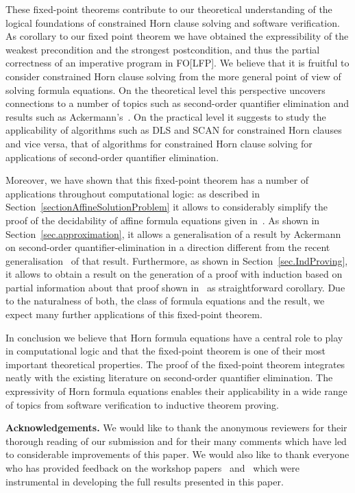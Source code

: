 \documentclass[acmsmall]{acmart}
\theoremstyle{plain}
\theoremstyle{definition}
\begin{document}
These fixed-point theorems contribute to our theoretical understanding of the logical foundations of
 constrained Horn clause solving and software verification.
As corollary to our fixed point theorem we have obtained the expressibility of the
 weakest precondition and the strongest postcondition, and thus the partial correctness of an imperative
 program in FO[LFP].
We believe that it is fruitful to consider constrained Horn clause solving from the more general
 point of view of solving formula equations.
On the theoretical level this perspective uncovers connections to a number of topics such as
 second-order quantifier elimination and results such as Ackermann's~\cite{Ackermann35Untersuchungen}.
On the practical level it suggests to study the applicability of algorithms such as DLS and SCAN for
 constrained Horn clauses and vice versa, that of algorithms for constrained Horn clause solving for
 applications of second-order quantifier elimination.

Moreover, we have shown that this fixed-point theorem has a number of applications throughout
 computational logic:
as described in Section~\ref{sectionAffineSolutionProblem} it allows to considerably simplify the
 proof of the decidability of affine formula equations given in~\cite{Hetzl20Decidability}.
As shown in Section~\ref{sec.approximation}, it allows a generalisation of a result by
 Ackermann~\cite{Ackermann35Untersuchungen} on second-order quantifier-elimination in a direction different
 from the recent generalisation~\cite{Wernhard17Approximating} of that result.
Furthermore, as shown in Section~\ref{sec.IndProving}, it allows to obtain a result on the generation of
 a proof with induction based on partial information about that proof shown in~\cite{Eberhard15Inductive}
 as straightforward corollary.
Due to the naturalness of both, the class of formula equations and the result, we expect many further
 applications of this fixed-point theorem.
 
In conclusion we believe that Horn formula equations have a central role to play in computational logic
 and that the fixed-point theorem is one of their most important theoretical properties.
The proof of the fixed-point theorem integrates neatly with the existing literature on second-order
 quantifier elimination.
The expressivity of Horn formula equations enables their applicability in a wide range of topics from
 software verification to inductive theorem proving.
 
 
{\bf Acknowledgements.} We would like to thank the anonymous reviewers for their thorough
 reading of our submission and for their many comments which have led to considerable
 improvements of this paper.
 We would also like to thank everyone who has provided feedback on the workshop papers~\cite{Hetzl21Fixpoint} and~\cite{Hetzl21Abstract} which were instrumental in
 developing the full results presented in this paper.
 


\end{document}
